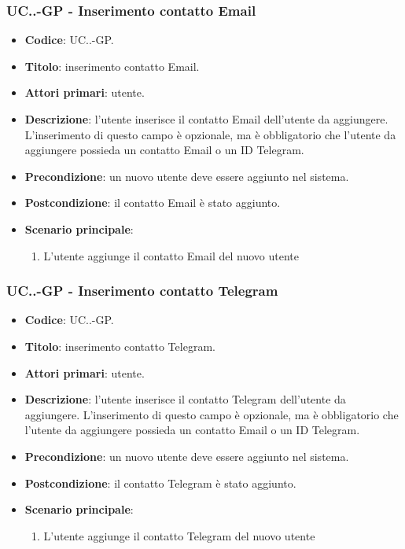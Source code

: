 		\subsubsection{UC\theuccount.\thesubuccount.\thesubsubuccount-GP - Inserimento contatto Email}

			\begin{itemize}
				\item \textbf{Codice}: UC\theuccount.\thesubuccount.\thesubsubuccount-GP.
				\item \textbf{Titolo}: inserimento contatto Email.
				\item \textbf{Attori primari}: utente.
				\item \textbf{Descrizione}: l'utente inserisce il contatto Email dell'utente da aggiungere. L'inserimento di questo campo è opzionale, ma è obbligatorio che l'utente da aggiungere possieda un contatto Email o un ID Telegram.
				\item \textbf{Precondizione}: un nuovo utente deve essere aggiunto nel sistema.
				\item \textbf{Postcondizione}: il contatto Email è stato aggiunto.
				\item \textbf{Scenario principale}:
				\begin{enumerate}
					\item L'utente aggiunge il contatto Email del nuovo utente
				\end{enumerate}
		\end{itemize}

		\subsubsection{UC\theuccount.\thesubuccount.\thesubsubuccount-GP - Inserimento contatto Telegram}

			\begin{itemize}
				\item \textbf{Codice}: UC\theuccount.\thesubuccount.\thesubsubuccount-GP.
				\item \textbf{Titolo}: inserimento contatto Telegram.
				\item \textbf{Attori primari}: utente.
				\item \textbf{Descrizione}: l'utente inserisce il contatto Telegram dell'utente da aggiungere. L'inserimento di questo campo è opzionale, ma è obbligatorio che l'utente da aggiungere possieda un contatto Email o un ID Telegram.
				\item \textbf{Precondizione}: un nuovo utente deve essere aggiunto nel sistema.
				\item \textbf{Postcondizione}: il contatto Telegram è stato aggiunto.
				\item \textbf{Scenario principale}:
				\begin{enumerate}
					\item L'utente aggiunge il contatto Telegram del nuovo utente
				\end{enumerate}
			\end{itemize}

